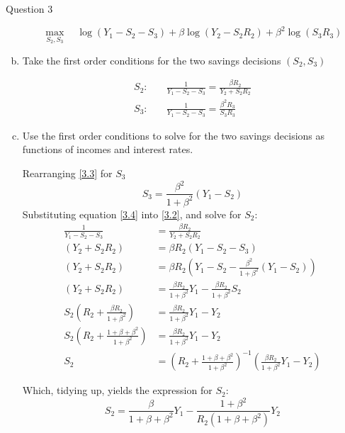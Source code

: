 \documentclass[a4paper]{article}
\begin{document}
\begin{questionbox}{Question 3}
\begin{enumerate}[(a)]
\begin{explanationbox}
				\[
					\max_{S_2,S_3} \quad \log(Y_1 - S_2 - S_3) + \beta\log(Y_2 - S_2R_2) + \beta^2\log(S_3R_3)
				\]
			\end{explanationbox}
			\item Take the first order conditions for the two savings decisions \( (S_2,S_3) \)
			\begin{explanationbox}
				\begin{align}
					S_2: \quad & \frac{1}{Y_1-S_2-S_3} = \frac{\beta R_2}{Y_2 + S_2R_2} \label{3.2}\\
					S_3: \quad & \frac{1}{Y_1-S_2-S_3} = \frac{\beta^2R_3}{S_3R_3} \label{3.3}
				\end{align}
			\end{explanationbox}
			\item Use the first order conditions to solve for the two savings decisions as functions of incomes and interest rates.
			\begin{explanationbox}
				Rearranging \cref{3.3} for \( S_3 \)
				\begin{equation}
					S_3 = \frac{\beta^2}{1+\beta^2}(Y_1 - S_2) \label{3.4}
				\end{equation}
				Substituting equation \cref{3.4} into \cref{3.2}, and solve for \( S_2 \):
				\begin{align*}
					\frac{1}{Y_1-S_2-S_3} &= \frac{\beta R_2}{Y_2 + S_2R_2}\\
					(Y_2 + S_2R_2) &= \beta R_2 (Y_1 - S_2 - S_3)\\
					(Y_2 + S_2R_2) &= \beta R_2 \left( Y_1 - S_2 - \frac{\beta^2}{1+\beta^2}(Y_1 - S_2) \right)\\
					(Y_2 + S_2R_2) &= \frac{\beta R_2}{1 + \beta^2} Y_1 - \frac{\beta R_2}{1 + \beta^2} S_2\\
					S_2 \left( R_2 + \frac{\beta R_2}{1 + \beta^2} \right) &= \frac{\beta R_2}{1 + \beta^2} Y_1-Y_2\\
					S_2 \left( R_2 + \frac{1 + \beta + \beta^2}{1 + \beta^2} \right) &= \frac{\beta R_2}{1 + \beta^2} Y_1-Y_2\\
					S_2 &= \left( R_2 + \frac{1 + \beta + \beta^2}{1 + \beta^2} \right)^{-1} \left( \frac{\beta R_2}{1 + \beta^2} Y_1-Y_2 \right)
				\end{align*}
			\end{explanationbox}
			\begin{explanationbox}
				Which, tidying up, yields the expression for \( S_2 \):
				\begin{equation}
					S_2 = \frac{\beta}{1 + \beta + \beta^2} Y_1 - \frac{1 + \beta^2}{R_2(1 + \beta + \beta^2)}Y_2 \label{3.5}

\end{equation}
\end{explanationbox}
\end{enumerate}
\end{questionbox}
\end{document}
